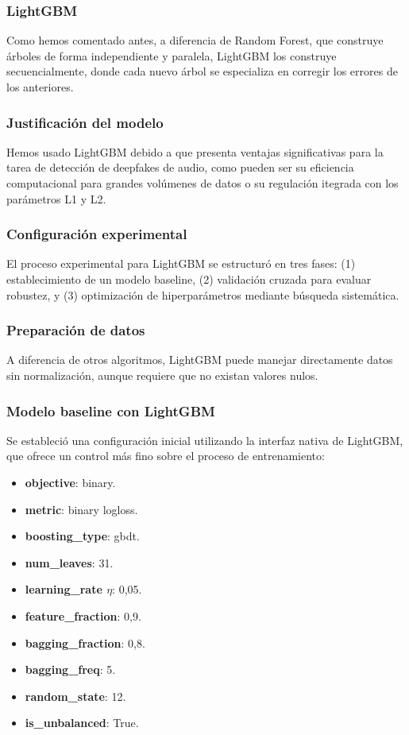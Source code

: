 \subsubsection{LightGBM}

Como hemos comentado antes, a diferencia de Random Forest, que construye árboles de forma independiente y paralela, LightGBM los construye secuencialmente, donde cada nuevo árbol se especializa en corregir los errores de los anteriores.

\subsubsection*{Justificación del modelo}

Hemos usado LightGBM debido a que presenta ventajas significativas para la tarea de detección de deepfakes de audio, como pueden ser su eficiencia computacional para grandes volúmenes de datos o su regulación itegrada con los parámetros L1 y L2.

\subsubsection*{Configuración experimental}

El proceso experimental para LightGBM se estructuró en tres fases: (1) establecimiento de un modelo baseline, (2) validación cruzada para evaluar robustez, y (3) optimización de hiperparámetros mediante búsqueda sistemática.

\subsubsection*{Preparación de datos}
A diferencia de otros algoritmos, LightGBM puede manejar directamente datos sin normalización, aunque requiere que no existan valores nulos.

\subsubsection*{Modelo baseline con LightGBM}
Se estableció una configuración inicial utilizando la interfaz nativa de LightGBM, que ofrece un control más fino sobre el proceso de entrenamiento:

\begin{itemize}
	\item \textbf{objective}: binary.
	\item \textbf{metric}: binary logloss.
	\item \textbf{boosting\_type}: gbdt.
	\item \textbf{num\_leaves}: 31.
	\item \textbf{learning\_rate \(\eta\)}: 0,05.
	\item \textbf{feature\_fraction}: 0,9.
	\item \textbf{bagging\_fraction}: 0,8.
	\item \textbf{bagging\_freq}: 5.
	\item \textbf{random\_state}: 12.
	\item \textbf{is\_unbalanced}: True.
\end{itemize}

